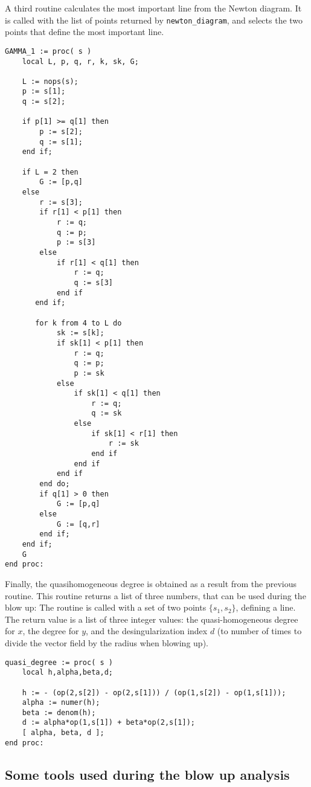 \documentclass[a4paper,10pt]{article}
\begin{document}
A third routine calculates the most important line from the Newton diagram.  It is
called with the list of points returned by \verb+newton_diagram+, and selects the
two points that define the most important line.

\begin{lstlisting}[name=blowup]
GAMMA_1 := proc( s )
    local L, p, q, r, k, sk, G;

    L := nops(s);
    p := s[1];
    q := s[2];

    if p[1] >= q[1] then
        p := s[2];
        q := s[1];
    end if;

    if L = 2 then
        G := [p,q]
    else
        r := s[3];
        if r[1] < p[1] then
            r := q;
            q := p;
            p := s[3]
        else
            if r[1] < q[1] then
                r := q;
                q := s[3]
            end if
       end if;

       for k from 4 to L do
            sk := s[k];
            if sk[1] < p[1] then
                r := q;
                q := p;
                p := sk
            else
                if sk[1] < q[1] then
                    r := q;
                    q := sk
                else
                    if sk[1] < r[1] then
                        r := sk
                    end if
                end if
            end if
        end do;
        if q[1] > 0 then
            G := [p,q]
        else
            G := [q,r]
        end if;
    end if;
    G
end proc:
\end{lstlisting}

Finally, the quasihomogeneous degree is obtained as a result from the previous routine.
This routine returns a list of three numbers, that can be used during the blow up:
The routine is called with a set of two points $\{s_1,s_2\}$, defining a line.  The return
value is a list of three integer values: the quasi-homogeneous degree for $x$, the degree for $y$,
and the desingularization index $d$ (to number of times to divide the vector field by the radius when
blowing up).

\begin{lstlisting}[name=blowup]
quasi_degree := proc( s )
    local h,alpha,beta,d;

    h := - (op(2,s[2]) - op(2,s[1])) / (op(1,s[2]) - op(1,s[1]));
    alpha := numer(h);
    beta := denom(h);
    d := alpha*op(1,s[1]) + beta*op(2,s[1]);
    [ alpha, beta, d ];
end proc:
\end{lstlisting}

\subsection{Some tools used during the blow up analysis}
\end{document}
